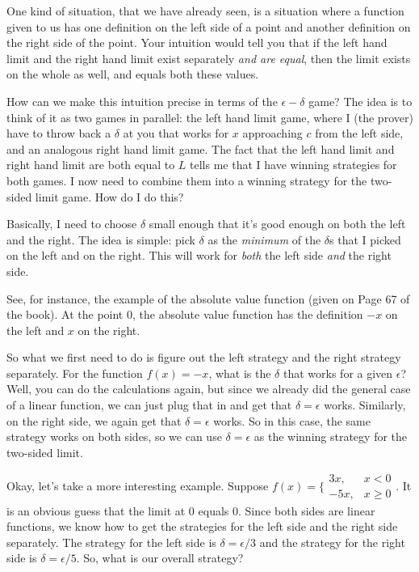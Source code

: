 \documentclass[10pt]{amsart}
\begin{document}
One kind of situation, that we have already seen, is a situation where
a function given to us has one definition on the left side of a point
and another definition on the right side of the point. Your intuition
would tell you that if the left hand limit and the right hand limit
exist separately {\em and are equal}, then the limit exists on the
whole as well, and equals both these values.

How can we make this intuition precise in terms of the
$\epsilon-\delta$ game? The idea is to think of it as two games in
parallel: the left hand limit game, where I (the prover) have to throw
back a $\delta$ at you that works for $x$ approaching $c$ from the
left side, and an analogous right hand limit game. The fact that the
left hand limit and right hand limit are both equal to $L$ tells me
that I have winning strategies for both games. I now need to combine
them into a winning strategy for the two-sided limit game. How do I do
this?

Basically, I need to choose $\delta$ small enough that it's good
enough on both the left and the right. The idea is simple: pick
$\delta$ as the {\em minimum} of the $\delta$s that I picked on the left and
on the right. This will work for {\em both} the left side {\em and}
the right side.

See, for instance, the example of the absolute value function (given
on Page 67 of the book). At the point $0$, the absolute value function
has the definition $-x$ on the left and $x$ on the right.

So what we first need to do is figure out the left strategy and the
right strategy separately. For the function $f(x) = -x$, what is the
$\delta$ that works for a given $\epsilon$? Well, you can do the
calculations again, but since we already did the general case of a
linear function, we can just plug that in and get that $\delta =
\epsilon$ works. Similarly, on the right side, we again get that
$\delta = \epsilon$ works. So in this case, the same strategy works on
both sides, so we can use $\delta = \epsilon$ as the winning strategy
for the two-sided limit.

Okay, let's take a more interesting example. Suppose $f(x) =
\lbrace\begin{array}{ll}3x,& x < 0\\-5x, & x \ge 0\end{array}$. It is an
obvious guess that the limit at $0$ equals $0$. Since both sides are
linear functions, we know how to get the strategies for the left side
and the right side separately. The strategy for the left side is
$\delta = \epsilon/3$ and the strategy for the right side is $\delta =
\epsilon/5$. So, what is our overall strategy?
\end{document}
